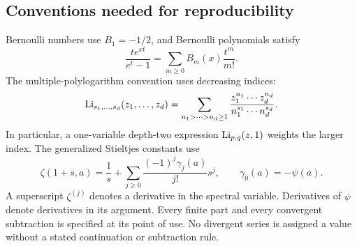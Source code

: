 \subsection{Conventions needed for reproducibility}

Bernoulli numbers use $B_1=-1/2$, and Bernoulli polynomials satisfy
\[
 \frac{te^{xt}}{e^t-1}=\sum_{m\ge0}B_m(x)\frac{t^m}{m!}.
\]
The multiple-polylogarithm convention uses decreasing indices:
\[
 \operatorname{Li}_{s_1,\ldots,s_d}(z_1,\ldots,z_d)
 =\sum_{n_1>\cdots>n_d\ge1}
       \frac{z_1^{n_1}\cdots z_d^{n_d}}
            {n_1^{s_1}\cdots n_d^{s_d}}.
\]
In particular, a one-variable depth-two expression
$\operatorname{Li}_{p,q}(z,1)$ weights the larger index. The generalized Stieltjes
constants use
\[
 \zeta(1+s,a)=\frac1s+
       \sum_{j\ge0}\frac{(-1)^j\gamma_j(a)}{j!}s^j,
 \qquad \gamma_0(a)=-\psi(a).
\]
A superscript $\zeta^{(j)}$ denotes a derivative in the spectral
variable. Derivatives of $\psi$ denote derivatives in its argument.
Every finite part and every convergent subtraction is specified at
its point of use. No divergent series is assigned a value without
a stated continuation or subtraction rule.
